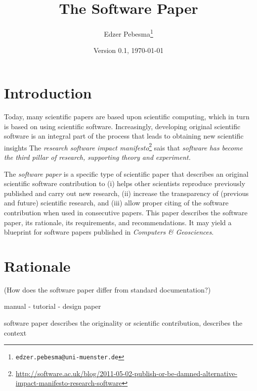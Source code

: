 \documentclass{article}
\author{Edzer Pebesma\footnote{{\tt edzer.pebesma@uni-muenster.de}}}
\date{Version 0.1, \today}
\title{\bf The Software Paper}
\begin{document}
\maketitle

\section{Introduction}
Today, many scientific papers are based upon scientific
computing, which in turn is based on using scientific
software. Increasingly, developing original scientific
software is an integral part of the process that leads to
obtaining new scientific insights The {\em research software impact
manifesto}\footnote{\url{http://software.ac.uk/blog/2011-05-02-publish-or-be-damned-alternative-impact-manifesto-research-software}}
sais that {\em software has become the third pillar of research,
supporting theory and experiment.}

The {\em software paper} is a specific type of scientific paper
that describes an original scientific software contribution to (i)
helps other scientists reproduce previously published and carry
out new research, (ii) increase the transparency of (previous and
future) scientific research, and (iii) allow proper citing of the
software contribution when used in consecutive papers. This paper
describes the software paper, its rationale, its requirements,
and recommendations. It may yield a blueprint for software papers
published in {\em Computers \& Geosciences}.

\section{Rationale}

(How does the software paper differ from standard documentation?)

manual - tutorial - design paper

software paper describes the originality or scientific contribution,
describes the context
\end{document}
